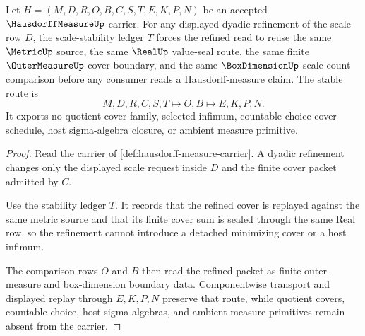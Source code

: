 \begin{theorem}
\label{thm:hausdorff-measure-dyadic-cover-stability}
Let $H=(M,D,R,O,B,C,S,T,E,K,P,N)$ be an accepted $\HausdorffMeasureUp$ carrier. For any displayed dyadic refinement of the scale row $D$, the scale-stability ledger $T$ forces the refined read to reuse the same $\MetricUp$ source, the same $\RealUp$ value-seal route, the same finite $\OuterMeasureUp$ cover boundary, and the same $\BoxDimensionUp$ scale-count comparison before any consumer reads a Hausdorff-measure claim. The stable route is
$$
M,D,R,C,S,T \longmapsto O,B \longmapsto E,K,P,N .
$$
It exports no quotient cover family, selected infimum, countable-choice cover schedule, host sigma-algebra closure, or ambient measure primitive.
\end{theorem}
\begin{proof}
Read the carrier of \autoref{def:hausdorff-measure-carrier}. A dyadic refinement changes only the displayed scale request inside $D$ and the finite cover packet admitted by $C$.

Use the stability ledger $T$. It records that the refined cover is replayed against the same metric source and that its finite cover sum is sealed through the same Real row, so the refinement cannot introduce a detached minimizing cover or a host infimum.

The comparison rows $O$ and $B$ then read the refined packet as finite outer-measure and box-dimension boundary data. Componentwise transport and displayed replay through $E,K,P,N$ preserve that route, while quotient covers, countable choice, host sigma-algebras, and ambient measure primitives remain absent from the carrier.
\end{proof}



